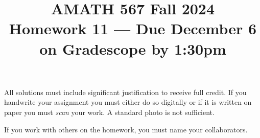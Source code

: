 \documentclass[10pt]{amsart}
\theoremstyle{nonumberplain}
\begin{document}
\pagestyle{empty}

\newcommand{\mline}{\vspace{.2in}\hrule\vspace{.2in}}
\renewcommand{\vec}{\mathbf}


\title{\bf { AMATH 567 Fall 2024 \\ Homework 11 ---
    Due December 6 on Gradescope by 1:30pm} }


\maketitle

\begin{center}
  All solutions must include significant justification to receive full credit.  If you handwrite your assignment you must either do so digitally or if it is written on paper you must \emph{scan} your work.  A standard photo is not sufficient.  \vskip 4pt

  If you work with others on the homework, you must name your collaborators.
\end{center}
\end{document}
